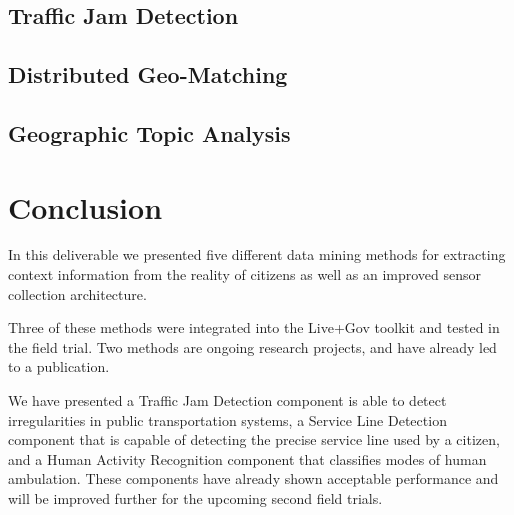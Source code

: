 \documentclass[external]{20120615_deliverable_template_ukob}
\theoremstyle{definition}
\begin{document}
\clearpage
\section{Traffic Jam Detection}
\label{sec:TJD}


\clearpage
\section{Distributed Geo-Matching}
\label{sec:DGM}


\clearpage
\section{Geographic Topic Analysis}
\label{sec:GTA}


\clearpage
\chapter{Conclusion}

In this deliverable we presented five different data mining methods
for extracting context information from the reality of
citizens as well as an improved sensor collection architecture.

Three of these methods were integrated into the Live+Gov toolkit and
tested in the field trial. Two methods are ongoing research projects,
and have already led to a publication.

We have presented a Traffic Jam Detection component is able to detect
irregularities in public transportation systems, a Service Line
Detection component that is capable of detecting the precise service
line used by a citizen, and a Human Activity Recognition component
that classifies modes of human ambulation. These components have
already shown acceptable performance and will be improved further for
the upcoming second field trials.

\clearpage

\end{document}
